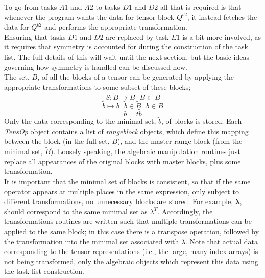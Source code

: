 \noindent To go from tasks $A1$ and $A2$ to tasks $D1$ and $D2$ all that is
required is that whenever the program wants the data for tensor block $Q^{b2}$,
it instead fetches the data for $Q^{b2}$ and performs the appropriate
transformation.\\

\noindent Ensuring that tasks $D1$ and $D2$ are replaced by task
$E1$ is a bit more involved, as it requires that symmetry is accounted 
for during the construction of the task list. The full details of this
will wait until the next section, but the basic ideas governing 
how symmetry is handled can be discussed now.\\

\noindent The set, $B$, of all the blocks of a tensor can be generated by applying
the appropriate transformations to some subset of these blocks;
\begin{equation*}
S : \tilde{B} \rightarrow B  \text { \ \ \ } \tilde{B} \subset B
\end{equation*}
\begin{equation*}
   \tilde{b} \mapsto b   \text { \ \ \ } \tilde b\in \tilde{B} \text{ \ \ \ } b \in B
\end{equation*}
\begin{equation}
   b = t \tilde{b} 
\end{equation}
Only the data corresponding to the minimal set, $\tilde{b}$, of blocks is stored. 
Each \emph{TensOp} object contains a list of \emph{rangeblock} objects, which
define this mapping between the  block (in the full set, $B$), and
the master range block (from the minimal set, $\tilde{B}$). Loosely speaking,
the algebraic manipulation routines just replace all appearances of the original 
blocks with master blocks, plus some transformation.\\ 

\noindent It is important that the minimal set of blocks is consistent, so
that if the same operator appears at multiple places in the same expression, only
subject to different transformations, no unnecessary blocks are stored. For
example, $\mathbf{\lambda}$, should correspond to the same minimal
set as $\lambda^{T}$. Accordingly, the transformations routines are 
written such that multiple transformations can be applied to the same block; in this case
there is a transpose operation, followed by the transformation into the minimal set 
associated with $\lambda$. Note that actual data  corresponding to the tensor representations
(i.e., the large, many index arrays) is not being transformed, only the algebraic objects 
which represent this data using the task list construction.

